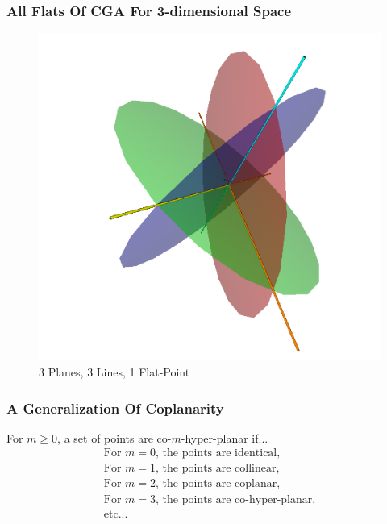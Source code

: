 \documentclass{beamer}
\begin{document}
\begin{frame}
\frametitle{All Flats Of CGA For 3-dimensional Space}
\begin{figure}
\centering
\includegraphics[scale=0.2]{Flats}
\caption{3 Planes, 3 Lines, 1 Flat-Point}
\end{figure}
\end{frame}

\begin{frame}
\frametitle{A Generalization Of Coplanarity}
\begin{definition}
For $m\geq 0$, a set of points are \alert{co-$m$-hyper-planar} if...
\begin{equation*}
\begin{array}{l}
\mbox{For $m=0$, the points are identical,} \\
\mbox{For $m=1$, the points are collinear,} \\
\mbox{For $m=2$, the points are coplanar,} \\
\mbox{For $m=3$, the points are co-hyper-planar,} \\
\mbox{etc...}
\end{array}
\end{equation*}
\end{definition}
\end{frame}
\end{document}
